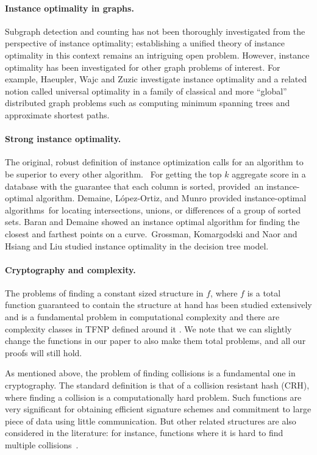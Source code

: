 \documentclass[11pt]{article}
\numberwithin{equation}{section}
\newcommand{\1}{\mathbf{1}}
\begin{document}
\paragraph{Instance optimality in graphs.}
Subgraph detection and counting has not been thoroughly investigated from the perspective of instance optimality; establishing a unified theory of instance optimality in this context remains an intriguing open problem. However, instance optimality has been investigated for other graph problems of interest. For example, Haeupler, Wajc and Zuzic \cite{HWZ21} investigate instance optimality and a related notion called universal optimality in a family of classical and more ``global'' distributed graph problems such as computing minimum spanning trees and approximate shortest paths. 

\paragraph{Strong instance optimality.} The original, robust definition of instance optimization calls for an algorithm to be superior to every other algorithm.  For getting the top $k$ aggregate score in a database with the guarantee that each column is sorted, \cite{FaginLN03} provided an instance-optimal algorithm. Demaine, L\'{o}pez-Ortiz, and Munro \cite{DemaineLM00} provided instance-optimal algorithms for locating intersections, unions, or differences of a group of sorted sets. Baran and Demaine \cite{BaranD04} showed an instance optimal algorithm for finding the closest and farthest points on a curve. Grossman, Komargodski and Naor \cite{GrossmanKN20} and Hsiang and Liu \cite{HsiangL23} studied instance optimality in the decision tree model. 





 \paragraph{Cryptography and complexity.}
 The problems of finding a constant sized structure in $f$, where $f$ is a total function guaranteed to contain the structure at hand has been studied extensively and is a fundamental problem in computational complexity and there are complexity classes in TFNP defined around it \cite{MegiddoP91,Papadimitriou94}. We note that we can slightly change the functions in our paper to also make them total problems, and all our proofs will still hold. 

As mentioned above, the problem of finding collisions is a fundamental one in cryptography. The standard definition is that of a collision resistant hash (CRH),  where finding a collision is a computationally hard problem. Such functions are very significant for obtaining efficient signature schemes and commitment to large piece of data using little communication. But other related structures are also considered in the literature: for instance, functions where it is hard to find multiple collisions~\cite{KomargodskiNY18}. 
\end{document}
